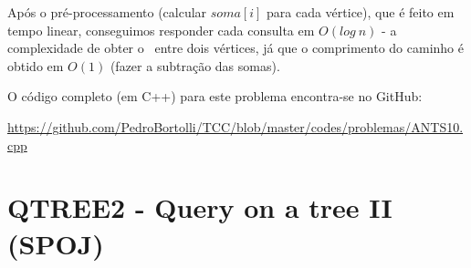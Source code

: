 Após o pré-processamento (calcular $soma[i]$ para cada vértice), que é feito em tempo linear, conseguimos responder cada consulta em $O(log\ n)$ - a complexidade de obter o \LCA\ entre dois vértices, já que o comprimento do caminho é obtido em $O(1)$ (fazer a subtração das somas).

\vspace{0.5cm}

O código completo (em C++) para este problema encontra-se no GitHub:

\url{https://github.com/PedroBortolli/TCC/blob/master/codes/problemas/ANTS10.cpp}

\vspace{20cm}

\section{QTREE2 - Query on a tree II  (SPOJ)}

